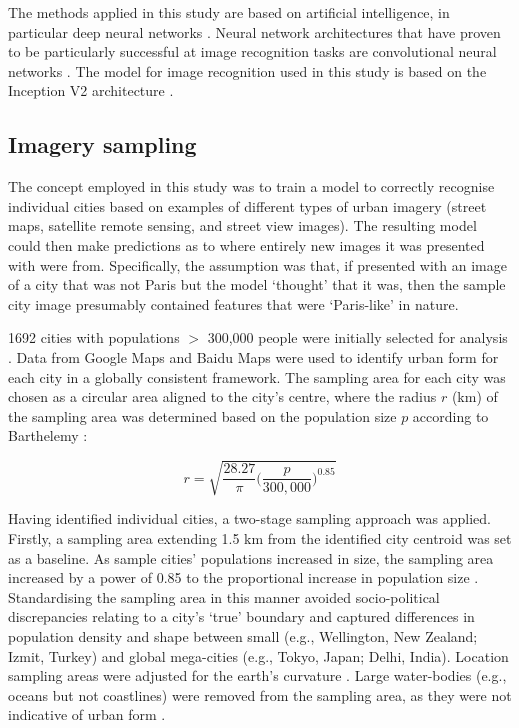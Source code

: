 \documentclass[Crown,sageh,times]{sagej}
\begin{document}
The methods applied in this study are based on artificial intelligence, in particular deep neural networks \cite{Bishop1995,Samarasinghe2016,Graupe2013}. Neural network architectures that have proven to be particularly successful at image recognition tasks are convolutional neural networks \cite{Schmidhuber2015}. The model for image recognition used in this study is based on the Inception V2 architecture \cite{Szegedy2015,Ioffe2015}. 


\subsection{Imagery sampling}\label{sec:methods2}

The concept employed in this study was to train a model to correctly recognise individual cities based on examples of different types of urban imagery (street maps, satellite remote sensing, and street view images). The resulting model could then make predictions as to where entirely new images it was presented with were from. Specifically, the assumption was that, if presented with an image of a city that was not Paris but the model `thought' that it was, then the sample city image presumably contained features that were `Paris-like' in nature. 

1692 cities with populations $>$ 300,000 people were initially selected for analysis \cite{UN2014}. Data from Google Maps and Baidu Maps were used to identify urban form for each city in a globally consistent framework. The sampling area for each city was chosen as a circular area aligned to the city's centre, where the radius $r$ (km) of the sampling area was determined based on the population size $p$ according to Barthelemy \cite{Barthelemy2016}: 

\begin{equation}
r = \sqrt{ \frac{28.27}{\pi} \bigg( \frac{p}{300,000}  \bigg)^{0.85} }
\end{equation}

Having identified individual cities, a two-stage sampling approach was applied. Firstly, a sampling area extending 1.5 km from the identified city centroid \cite{UN2014} was set as a baseline. As sample cities' populations increased in size, the sampling area increased by a power of 0.85 to the proportional increase in population size \cite{Barthelemy2016}. Standardising the sampling area in this manner avoided socio-political discrepancies relating to a city's `true' boundary and captured differences in population density and shape between small (e.g., Wellington, New Zealand; Izmit, Turkey) and global mega-cities (e.g., Tokyo, Japan;  Delhi, India). Location sampling areas were adjusted for the earth's curvature \cite{Sinnott1984}. Large water-bodies (e.g., oceans but not coastlines) were removed from the sampling area, as they were not indicative of urban form . 
\end{document}
